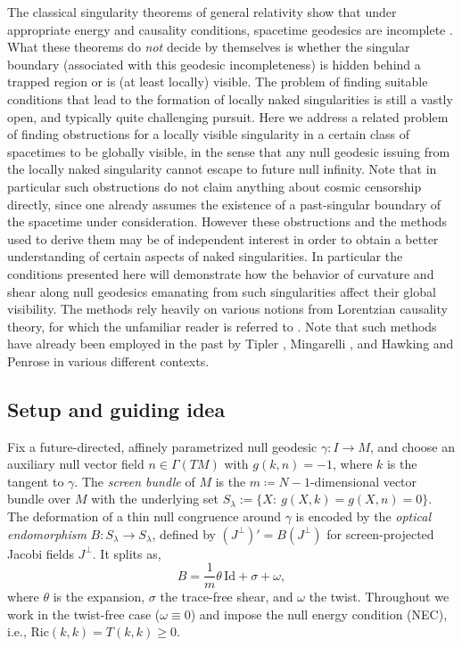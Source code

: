 \documentclass[a4paper, reqno]{amsart}
\numberwithin{equation}{section}
\theoremstyle{plain}
\theoremstyle{definition}
\theoremstyle{remark}
\newcommand{\Id}{\mathrm{Id}}
\begin{document}
The classical singularity theorems of general relativity show that under appropriate energy and causality conditions, spacetime geodesics are incomplete \cite{Hawking:1973uf}. What these theorems do \emph{not} decide by themselves is whether the singular boundary (associated with this geodesic incompleteness) is hidden behind a trapped region or is (at least locally) visible. The problem of finding suitable conditions that lead to the formation of locally naked singularities is still a vastly open, and typically quite challenging pursuit. Here we address a related problem of finding obstructions for a locally visible singularity in a certain class of spacetimes to be globally visible, in the sense that any null geodesic issuing from the locally naked singularity cannot escape to future null infinity. Note that in particular such obstructions do not claim anything about cosmic censorship \cite{ShlapentokhRothman2025WCC} directly, since one already assumes the existence of a past-singular boundary of the spacetime under consideration. However these obstructions and the methods used to derive them may be of independent interest in order to obtain a better understanding of certain aspects of naked singularities. In particular the conditions presented here will demonstrate how the behavior of curvature and shear along null geodesics emanating from such singularities affect their global visibility. The methods rely heavily on various notions from Lorentzian causality theory, for which the unfamiliar reader is referred to \cite{Minguzzi:2019mbe}. Note that such methods have already been employed in the past by Tipler \cite{TIPLER1978165,Tipler:1977zza,Tipler:1977zzb}, Mingarelli \cite{minga}, and Hawking and Penrose \cite{Hawking:1970zqf} in various different contexts. 

\subsection{Setup and guiding idea}
Fix a future-directed, affinely parametrized null geodesic $\gamma:I\to M$, and choose an auxiliary null vector field $n\in \Gamma(TM)$ with $g(k,n)=-1$, where $k$ is the tangent to $\gamma$. The \emph{screen bundle} of $M$ is the $m\coloneqq N-1$-dimensional vector bundle over $M$ with the underlying set $S_\lambda:=\{X:\ g(X,k)=g(X,n)=0\}$. The deformation of a thin null congruence around $\gamma$ is encoded by the \emph{optical endomorphism} $B:S_\lambda\to S_\lambda$, defined by $(J^\perp)'=B(J^\perp)$ for screen-projected Jacobi fields $J^\perp$.  It splits as,
$$\displaystyle B=\frac{1}{m}\theta\,\Id+\sigma+\omega,$$
where $\theta$ is the expansion, $\sigma$ the trace-free shear, and $\omega$ the twist. Throughout we work in the twist-free case ($\omega\equiv 0$) and impose the null energy condition (NEC), i.e., $\mathrm{Ric} (k,k)=T(k,k)\ge 0$.
\end{document}
